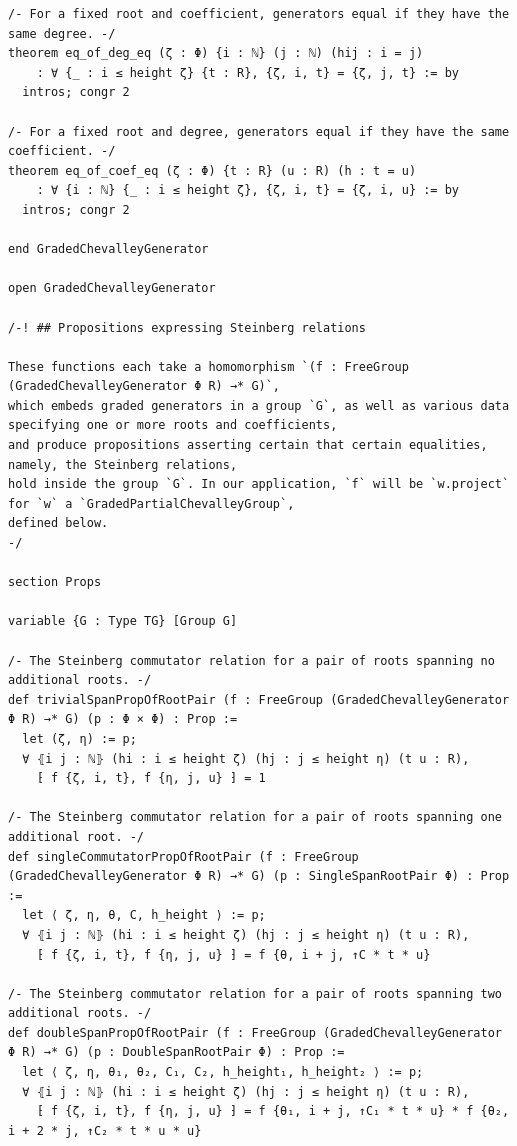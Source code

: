 \documentclass[10pt,a4paper]{article}
\begin{document}
\begin{Verbatim}
/- For a fixed root and coefficient, generators equal if they have the same degree. -/
theorem eq_of_deg_eq (ζ : Φ) {i : ℕ} (j : ℕ) (hij : i = j)
    : ∀ {_ : i ≤ height ζ} {t : R}, {ζ, i, t} = {ζ, j, t} := by
  intros; congr 2

/- For a fixed root and degree, generators equal if they have the same coefficient. -/
theorem eq_of_coef_eq (ζ : Φ) {t : R} (u : R) (h : t = u)
    : ∀ {i : ℕ} {_ : i ≤ height ζ}, {ζ, i, t} = {ζ, i, u} := by
  intros; congr 2

end GradedChevalleyGenerator

open GradedChevalleyGenerator

/-! ## Propositions expressing Steinberg relations

These functions each take a homomorphism `(f : FreeGroup (GradedChevalleyGenerator Φ R) →* G)`,
which embeds graded generators in a group `G`, as well as various data specifying one or more roots and coefficients,
and produce propositions asserting certain that certain equalities, namely, the Steinberg relations,
hold inside the group `G`. In our application, `f` will be `w.project` for `w` a `GradedPartialChevalleyGroup`,
defined below.
-/

section Props

variable {G : Type TG} [Group G]

/- The Steinberg commutator relation for a pair of roots spanning no additional roots. -/
def trivialSpanPropOfRootPair (f : FreeGroup (GradedChevalleyGenerator Φ R) →* G) (p : Φ × Φ) : Prop :=
  let (ζ, η) := p;
  ∀ ⦃i j : ℕ⦄ (hi : i ≤ height ζ) (hj : j ≤ height η) (t u : R),
    ⁅ f {ζ, i, t}, f {η, j, u} ⁆ = 1

/- The Steinberg commutator relation for a pair of roots spanning one additional root. -/
def singleCommutatorPropOfRootPair (f : FreeGroup (GradedChevalleyGenerator Φ R) →* G) (p : SingleSpanRootPair Φ) : Prop :=
  let ⟨ ζ, η, θ, C, h_height ⟩ := p;
  ∀ ⦃i j : ℕ⦄ (hi : i ≤ height ζ) (hj : j ≤ height η) (t u : R),
    ⁅ f {ζ, i, t}, f {η, j, u} ⁆ = f {θ, i + j, ↑C * t * u}

/- The Steinberg commutator relation for a pair of roots spanning two additional roots. -/
def doubleSpanPropOfRootPair (f : FreeGroup (GradedChevalleyGenerator Φ R) →* G) (p : DoubleSpanRootPair Φ) : Prop :=
  let ⟨ ζ, η, θ₁, θ₂, C₁, C₂, h_height₁, h_height₂ ⟩ := p;
  ∀ ⦃i j : ℕ⦄ (hi : i ≤ height ζ) (hj : j ≤ height η) (t u : R),
    ⁅ f {ζ, i, t}, f {η, j, u} ⁆ = f {θ₁, i + j, ↑C₁ * t * u} * f {θ₂, i + 2 * j, ↑C₂ * t * u * u}


\end{Verbatim}
\end{document}
